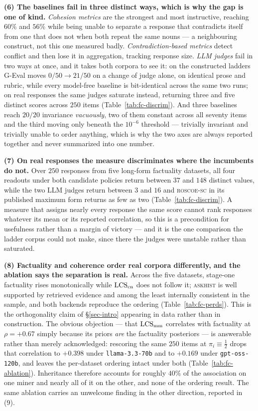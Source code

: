 \textbf{(6) The baselines fail in three distinct ways, which is why the gap is one of kind.} \emph{Cohesion
metrics} are the strongest and most instructive, reaching $60\%$ and $56\%$ while being unable to separate a
response that contradicts itself from one that does not when both repeat the same nouns --- a neighbouring
construct, not this one measured badly. \emph{Contradiction-based metrics} detect conflict and then lose it in
aggregation, tracking response size. \emph{LLM judges} fail in two ways at once, and it takes both corpora to see it: on the
constructed ladders G-Eval moves $0/50 \to 21/50$ on a change of judge alone, on identical prose and rubric,
while every model-free baseline is bit-identical across the same two runs; on real responses the same judges
saturate instead, returning three and five distinct scores across $250$ items
(Table~\ref{tab:fc-discrim}). And three baselines reach $20/20$ invariance \emph{vacuously}, two of them constant across all
seventy items and the third moving only beneath the $10^{-6}$ threshold --- trivially invariant and trivially
unable to order anything, which is why the two axes are always reported together and never summarized into one
number.

\textbf{(7) On real responses the measure discriminates where the incumbents do not.} Over $250$ responses
from five long-form factuality datasets, all four readouts under both candidate policies return between $37$ and
$148$ distinct values, while the two LLM judges return between $3$ and $16$ and \textsc{roscoe-sc} in its
published maximum form returns as few as two (Table~\ref{tab:fc-discrim}). A measure that assigns nearly every
response the same score cannot rank responses whatever its mean or its reported correlation, so this is a
precondition for usefulness rather than a margin of victory --- and it is the one comparison the ladder corpus
could not make, since there the judges were unstable rather than saturated.

\textbf{(8) Factuality and coherence order real corpora differently, and the ablation says the separation is
real.} Across the five datasets, stage-one factuality rises monotonically while $\mathrm{LCS}_{\mathrm{cn}}$ does not follow
it; \textsc{askhist} is well supported by retrieved evidence and among the least internally consistent in the
sample, and both backends reproduce the ordering (Table~\ref{tab:fc-perds}). This is the orthogonality claim of
\S\ref{sec-intro} appearing in data rather than in construction. The obvious objection --- that $\mathrm{LCS}_{\mathrm{mm}}$
correlates with factuality at $\rho=+0.67$ simply because its priors \emph{are} the factuality posteriors --- is
answerable rather than merely acknowledged: rescoring the same $250$ items at $\pi_i\equiv\tfrac12$ drops that
correlation to $+0.398$ under \texttt{llama-3.3-70b} and to $+0.169$ under \texttt{gpt-oss-120b}, and leaves the
per-dataset ordering intact under both (Table~\ref{tab:fc-ablation}). Inheritance therefore accounts for roughly
$40\%$ of the association on one miner and nearly all of it on the other, and none of the ordering result. The same ablation carries an
unwelcome finding in the other direction, reported in (9).

